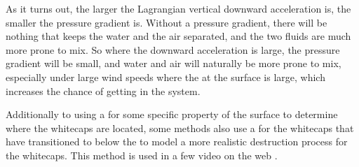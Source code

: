 As it turns out, the larger the Lagrangian vertical downward acceleration is, the smaller the pressure gradient is. Without a pressure gradient, there will be nothing that keeps the water and the air separated, and the two fluids are much more prone to mix. So where the downward acceleration is large, the pressure gradient will be small, and water and air will naturally be more prone to mix, especially under large wind speeds where the  at the surface is large, which increases the chance of getting  in the system.

Additionally to using a \threshold for some specific property of the surface to determine where the whitecaps are located, some methods also use a  for the whitecaps that have transitioned to below the \threshold to model a more realistic destruction process for the whitecaps. This method is used in a few video on the web \citep{ozernik2009,cebasVT2010}.
